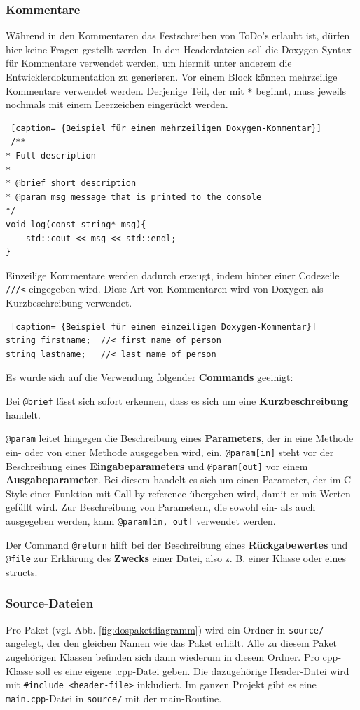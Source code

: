 \documentclass[../review_3.tex]{subfiles}
\begin{document}
\subsubsection{Kommentare}
Während in den Kommentaren das Festschreiben von ToDo's erlaubt ist, dürfen hier keine Fragen gestellt werden. In den Headerdateien soll die Doxygen-Syntax für Kommentare verwendet werden, um hiermit unter anderem die Entwicklerdokumentation zu generieren. Vor einem Block können mehrzeilige Kommentare verwendet werden. Derjenige Teil, der mit \texttt{*} beginnt, muss jeweils nochmals mit einem Leerzeichen eingerückt werden.
\begin{lstlisting} [caption= {Beispiel für einen mehrzeiligen Doxygen-Kommentar}]
 /**
* Full description
*
* @brief short description
* @param msg message that is printed to the console
*/
void log(const string* msg){
    std::cout << msg << std::endl;
} \end{lstlisting}
Einzeilige Kommentare werden dadurch erzeugt, indem hinter einer Codezeile \texttt{///<} eingegeben wird. Diese Art von Kommentaren wird von Doxygen als Kurzbeschreibung verwendet.
\begin{lstlisting} [caption= {Beispiel für einen einzeiligen Doxygen-Kommentar}]
string firstname;  //< first name of person
string lastname;   //< last name of person
\end{lstlisting}

Es wurde sich auf die Verwendung folgender \textbf{Commands} geeinigt:

Bei \texttt{@brief} lässt sich sofort erkennen, dass es sich um eine \textbf{Kurzbeschreibung} handelt.

\texttt{@param} leitet hingegen die Beschreibung eines \textbf{Parameters}, der in eine Methode ein- oder von einer Methode ausgegeben wird, ein. \texttt{@param[in]} steht vor der Beschreibung eines \textbf{Eingabeparameters} und \texttt{@param[out]} vor einem \textbf{Ausgabeparameter}. Bei diesem handelt es sich um einen Parameter, der im C-Style einer Funktion mit Call-by-reference übergeben wird, damit er mit Werten gefüllt wird. Zur Beschreibung von Parametern, die sowohl ein- als auch ausgegeben werden, kann \texttt{@param[in, out]} verwendet werden.

Der Command \texttt{@return} hilft bei der Beschreibung eines \textbf{Rückgabewertes} und \texttt{@file} zur Erklärung des \textbf{Zwecks} einer Datei, also z. B. einer Klasse oder eines structs.

\subsubsection{Source-Dateien}
Pro Paket (vgl. Abb. \ref{fig:dospaketdiagramm}) wird ein Ordner in \texttt{source/} angelegt, der den gleichen Namen wie das Paket erhält. Alle zu diesem Paket zugehörigen Klassen befinden sich dann wiederum in diesem Ordner. Pro cpp-Klasse soll es eine eigene .cpp-Datei geben. Die dazugehörige Header-Datei  wird mit \texttt{\#include <header-file>} inkludiert. Im ganzen Projekt gibt es eine \texttt{main.cpp}-Datei in \texttt{source/} mit der main-Routine.
\end{document}
